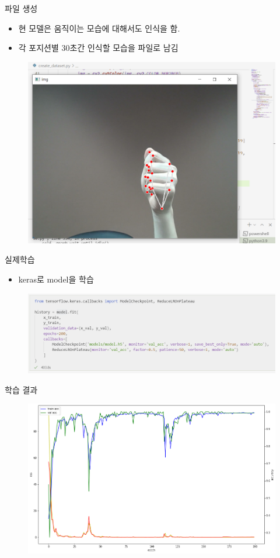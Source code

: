 \documentclass[10pt]{beamer}
\begin{document}
\begin{frame}{파일 생성}
    \begin{itemize}
        \item 현 모델은 움직이는 모습에 대해서도 인식을 함.
        \item 각 포지션별 30초간 인식할 모습을 파일로 남김
    \end{itemize}
    \begin{figure}
        \includegraphics[width=0.8\columnwidth]{aa.png}
    \end{figure}
\end{frame}




\begin{frame}{실제학습}
    \begin{itemize}
        \item keras로 model을 학습
    \end{itemize}
    \begin{figure}
        \includegraphics[width=0.8\columnwidth]{train1.png}
    \end{figure}
\end{frame}


\begin{frame}{학습 결과}
    \begin{figure}
        \includegraphics[width=0.9\columnwidth]{output.png}
    \end{figure}
\end{frame}
\end{document}
